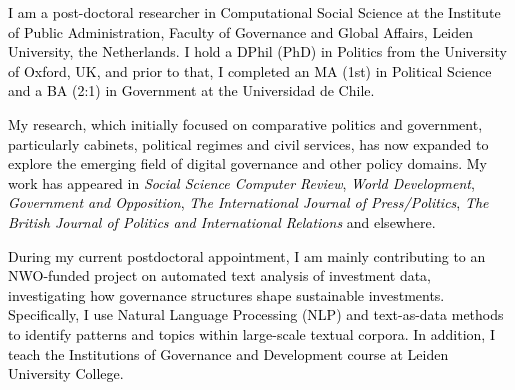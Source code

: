 




\vspace{3mm}

\begin{cvparagraph}

\textcolor{black}{I am a post-doctoral researcher in Computational Social Science at the Institute of Public Administration, Faculty of Governance and Global Affairs, Leiden University, the Netherlands. I hold a DPhil (PhD) in Politics from the University of Oxford, UK, and prior to that, I completed an MA (1st) in Political Science and a BA (2:1) in Government at the Universidad de Chile.}

\textcolor{black}{My research, which initially focused on comparative politics and government, particularly cabinets, political regimes and civil services, has now expanded to explore the emerging field of digital governance and other policy domains. My work has appeared in {\itshape Social Science Computer Review}, {\itshape World Development}, {\itshape Government and Opposition}, {\itshape The International Journal of Press/Politics}, {\itshape The British Journal of Politics and International Relations} and elsewhere.}

\textcolor{black}{During my current postdoctoral appointment, I am mainly contributing to an NWO-funded project on automated text analysis of investment data, investigating how governance structures shape sustainable investments. Specifically, I use Natural Language Processing (NLP) and text-as-data methods to identify patterns and topics within large-scale textual corpora. In addition, I teach the Institutions of Governance and Development course at Leiden University College.}
\vspace{1mm}
\end{cvparagraph}
